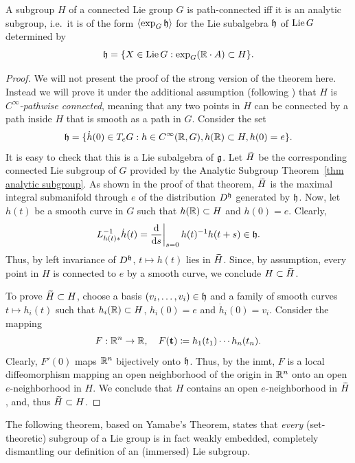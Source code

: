 \begin{thm}\label{thm Yamabe}
    A subgroup $H$ of a connected Lie group $G$ is path-connected iff it is an analytic subgroup, i.e.~it is of the form $\langle\exp_G\mathfrak{h}\rangle$ for the Lie subalgebra $\mathfrak{h}$ of $\operatorname{Lie} G$ determined by
    \[\mathfrak{h}=\{X\in\operatorname{Lie} G: \exp_G(\mathbb{R}\cdot A)\subset H\}.\]
\end{thm}
\begin{proof}
    We will not present the proof of the strong version of the theorem here. Instead we will prove it under the additional assumption (following \cite[Lem.~1.7.10]{RS2}) that $H$ is \emph{$C^\infty$-pathwise connected}, meaning that any two points in $H$ can be connected by a path inside $H$ that is smooth as a path in $G$. Consider the set
    \[\mathfrak{h}=\{\dot h(0)\in T_eG: h\in C^\infty(\mathbb{R},G),h(\mathbb{R})\subset H,h(0)=e\}.\]
    It is easy to check that this is a Lie subalgebra of $\mathfrak{g}$. Let $\wt H$ be the corresponding connected Lie subgroup of $G$ provided by the Analytic Subgroup Theorem~\ref{thm analytic subgroup}. As shown in the proof of that theorem, $\wt H$ is the maximal integral submanifold through $e$ of the distribution $D^{\mathfrak{h}}$ generated by $\mathfrak{h}$. Now, let $h(t)$ be a smooth curve in $G$ such that $h(\mathbb{R})\subset H$ and $h(0)=e$. Clearly,
    \[L_{h(t)\ast}^{-1}\dot h(t)=\restr{\frac{\dd}{\dd s}}{s=0}h(t)^{-1}h(t+s)\in\frakh.\]
    Thus, by left invariance of $D^{\mathfrak{h}}$, $t\mapsto h(t)$ lies in $\wt H$. Since, by assumption, every point in $H$ is connected to $e$ by a smooth curve, we conclude $H\subset \wt H$.

    To prove $\wt H\subset H$, choose a basis $(v_i,\ldots,v_i)\in \mathfrak{h}$ and a family of smooth curves $t\mapsto h_i(t)$ such that $h_i(\mathbb{R})\subset H$, $h_i(0)=e$ and $\dot h_i(0)=v_i$. Consider the mapping
    \[F:\mathbb{R}^n\to \mathbb{R},\quad F(\mathbf{t})\coloneqq h_1(t_1)\cdots h_n(t_n).\]
    Clearly, $F'(0)$ maps $\mathbb{R}^n$ bijectively onto $\mathfrak{h}$. Thus, by the \gls{inmt}, $F$ is a local diffeomorphism mapping an open neighborhood of the origin in $\mathbb{R}^n$ onto an open $e$-neighborhood in $H$. We conclude that $H$ contains an open $e$-neighborhood in $\wt H$, and, thus $\wt H\subset H$.
\end{proof}

The following theorem, based on Yamabe's Theorem, states that \emph{every} (set-theoretic) subgroup of a Lie group is in fact weakly embedded, completely dismantling our definition of an (immersed) Lie subgroup.

